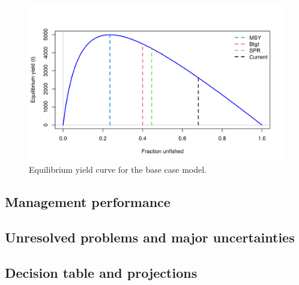 \documentclass[
]{scrartcl}
\begin{document}
\clearpage



\begin{figure}

{\centering \includegraphics[width=6in,height=\textheight]{r4ss_plots/yield2_yield_curve_with_refpoints.png}

}

\caption{\label{fig-es-yield}Equilibrium yield curve for the base case
model.}

\end{figure}

\clearpage

\hypertarget{management-performance}{%
\subsection*{Management performance}\label{management-performance}}

\hypertarget{unresolved-problems-and-major-uncertainties}{%
\subsection*{Unresolved problems and major
uncertainties}\label{unresolved-problems-and-major-uncertainties}}

\hypertarget{decision-table-and-projections}{%
\subsection*{Decision table and
projections}\label{decision-table-and-projections}}
\end{document}

